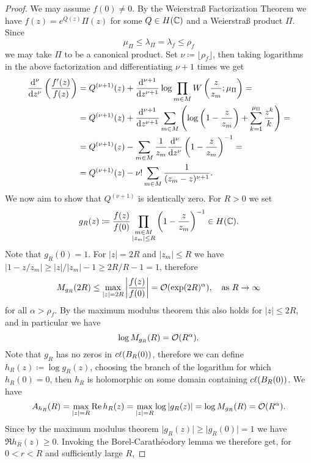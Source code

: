 \begin{proof}
    We may assume $f(0) \neq 0$. By the Weierstraß Factorization Theorem we have $f(z) = e^{Q(z)} \Pi(z)$ for some $Q \in H(\mathbb{C})$ and a Weierstraß product $\Pi$. Since
    $$ \mu_\Pi \leq \lambda_\Pi = \lambda_f \leq \rho_f $$
    we may take $\Pi$ to be a canonical product. Set $\nu \coloneqq \lfloor \rho_f \rfloor$, then taking logarithms in the above factorization and differentiating $\nu + 1$ times we get
    \begin{align*}
        \frac{\mathrm{d}^{\nu}}{\mathrm{d} {z}^{\nu}} \left( \frac{f'(z)}{f(z)} \right)
        &= Q^{(\nu+1)}(z) + \frac{\mathrm{d}^{\nu + 1}}{\mathrm{d} {z}^{\nu + 1}} \log \prod_{m \in M} W \left( \frac{z}{z_m}; \mu_\Pi \right) = \\
        &= Q^{(\nu+1)}(z) + \frac{\mathrm{d}^{\nu + 1}}{\mathrm{d} {z}^{\nu + 1}} \sum_{m \in M} \left( \log \left( 1 - \frac{z}{z_m} \right) + \sum_{k=1}^{\mu_\Pi} \frac{z^k}{k} \right) = \\
        &= Q^{(\nu+1)}(z) - \sum_{m \in M} \frac{1}{z_m} \frac{\mathrm{d}^{\nu}}{\mathrm{d} {z}^{\nu}} \left( 1 - \frac{z}{z_m} \right)^{-1} = \\
        &= Q^{(\nu+1)}(z) - \nu! \sum_{m \in M} \frac{1}{(z_m - z)^{\nu + 1}}.
    \end{align*}
    We now aim to show that $Q^{(\nu + 1)}$ is identically zero. For $R > 0$ we set
    $$ g_R(z) \coloneqq \frac{f(z)}{f(0)} \prod_{\substack{m \in M \\ \vert z_m \vert \leq R}} \left(1 - \frac{z}{z_m} \right)^{-1} \in H(\mathbb{C}). $$
    Note that $g_R(0) = 1$. For $\vert z \vert = 2R$ and $\vert z_m \vert \leq R$ we have $\vert 1 - z / z_m \vert \geq \vert z \vert / \vert z_m \vert - 1 \geq 2R/R - 1 = 1$, therefore
    $$ M_{g_R}(2R) \leq \max_{\vert z \vert = 2R} \left\vert \frac{f(z)}{f(0)} \right\vert = \mathcal{O}(\exp (2R)^\alpha), \quad \textrm{as } R \to \infty $$
    for all $\alpha > \rho_f$. By the maximum modulus theorem this also holds for $\vert z \vert \leq 2R$, and in particular we have
    $$ \log M_{g_R}(R) = \mathcal{O}(R^\alpha). $$
    Note that $g_R$ has no zeros in $c\ell({B_R(0)})$, therefore we can define $h_R(z) \coloneqq \log g_R(z)$, choosing the branch of the logarithm for which $h_R(0) = 0$, then $h_R$ is holomorphic on some domain containing $c\ell({B_R(0)})$. We have
    $$ A_{h_R}(R) = \max_{\vert z \vert = R} \operatorname{Re} h_R(z) = \max_{\vert z \vert = R} \log \vert g_R(z) \vert = \log M_{g_R}(R) = \mathcal{O}(R^\alpha). $$
    Since by the maximum modulus theorem $\vert g_R(z) \vert \geq \vert g_R(0) \vert = 1$ we have $\Re h_R(z) \geq 0$. Invoking the Borel-Carathéodory lemma we therefore get, for $0 < r < R$ and sufficiently large $R$,

\end{proof}

